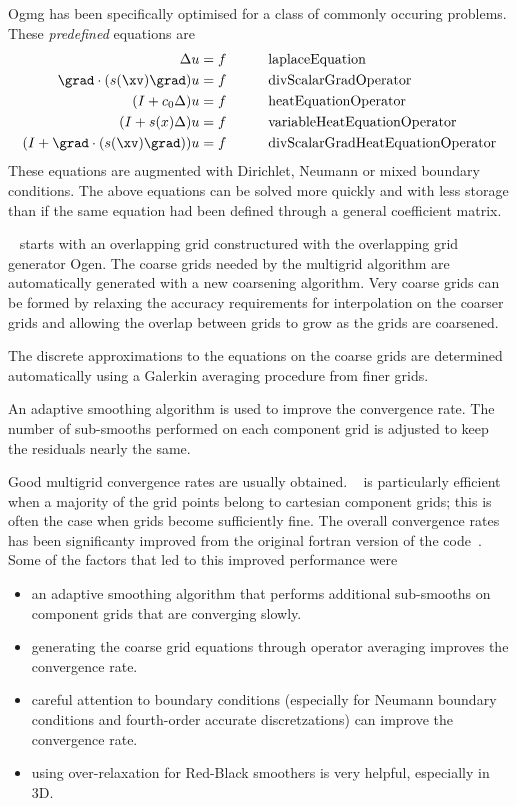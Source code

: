 \documentclass[11pt]{article}
\begin{document}

Ogmg has been specifically optimised for a class of commonly occuring problems. These
{\sl predefined} equations are 
\begin{alignat*}{3} \label{eq:predefined}
   \Delta u & = f &\qquad&  \mbox{laplaceEquation}  \\
   \grad\cdot( s(\xv) \grad) u & = f &\qquad&  \mbox{divScalarGradOperator} \\
   (I + c_0 \Delta) u & = f &\qquad&  \mbox{heatEquationOperator}  \\
  (I + s(x) \Delta) u & = f &\qquad&  \mbox{variableHeatEquationOperator}  \\
  (I + \grad\cdot( s(\xv) \grad)) u & = f &\qquad&  \mbox{divScalarGradHeatEquationOperator} 
\end{alignat*}
These equations are augmented with Dirichlet, Neumann or mixed boundary conditions.
The above equations can be solved more quickly and with less storage than if the same equation had been
defined through a general coefficient matrix.

\Ogmg~ starts with an overlapping grid constructured with the overlapping grid generator Ogen.
The coarse grids needed by the multigrid algorithm 
are automatically generated with a new coarsening algorithm. Very coarse grids
can be formed by relaxing the accuracy requirements for interpolation on the coarser grids and
allowing the overlap between grids to grow as the grids are coarsened.

The discrete approximations to the equations on the coarse grids are determined automatically
using a Galerkin averaging procedure from finer grids.

An adaptive smoothing algorithm is used to improve the convergence rate. The number of sub-smooths
performed on each component grid is adjusted to keep the residuals nearly the same.

Good multigrid convergence rates are usually obtained. 
\Ogmg~  is particularly efficient when a majority of the grid points belong to cartesian component grids;
this is often the case when grids become sufficiently fine.
The overall convergence rates has been significanty improved from the original fortran version of
the code~\cite{CGMG}. Some of the factors that led to this improved performance were
\begin{itemize}
  \item an adaptive smoothing algorithm that performs additional sub-smooths on component grids that 
        are converging slowly.
  \item generating the coarse grid equations through operator averaging improves the convergence rate.
  \item careful attention to boundary conditions (especially for Neumann boundary conditions and
    fourth-order accurate discretzations) can improve the convergence rate.
  \item using over-relaxation for Red-Black smoothers is very helpful, especially in 3D.
\end{itemize}
\end{document}
